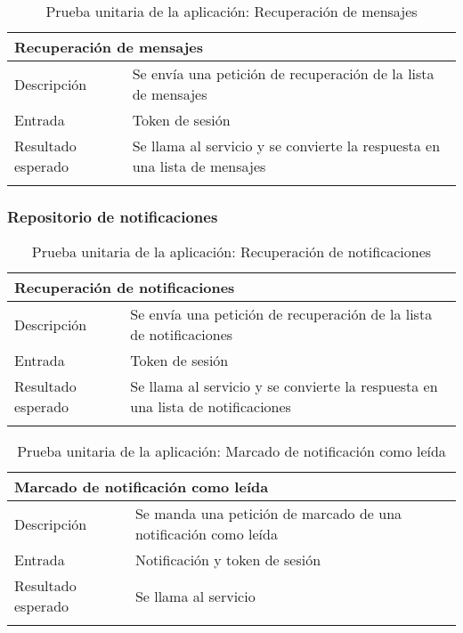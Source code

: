 \vspace{-15pt}
\begin{longtable}{|p{} p{}|}
    \hline
    \multicolumn{2}{|l|}{\textbf{Recuperación de mensajes}} \\ \hline 
    Descripción                 & Se envía una petición de recuperación de la lista de mensajes \\ \hline
    Entrada                     & Token de sesión \\ \hline
    Resultado esperado          & Se llama al servicio y se convierte la respuesta en una lista de mensajes \\ \hline
    \caption{Prueba unitaria de la aplicación: Recuperación de mensajes}
    \label{cp:u:app:recuperacion_mensajes_repo}
\end{longtable}
    
\vspace{-25pt}
\subsubsection{Repositorio de notificaciones}

\begin{longtable}{|p{} p{}|}
    \hline
    \multicolumn{2}{|l|}{\textbf{Recuperación de notificaciones}} \\ \hline 
    Descripción                 & Se envía una petición de recuperación de la lista de notificaciones \\ \hline
    Entrada                     & Token de sesión \\ \hline
    Resultado esperado          & Se llama al servicio y se convierte la respuesta en una lista de notificaciones \\ \hline
    \caption{Prueba unitaria de la aplicación: Recuperación de notificaciones}
    \label{cp:u:app:recuperacion_notificaciones_repo}
\end{longtable}

\vspace{-15pt}
\begin{longtable}{|p{} p{}|}
    \hline
    \multicolumn{2}{|l|}{\textbf{Marcado de notificación como leída}} \\ \hline 
    Descripción                 & Se manda una petición de marcado de una notificación como leída \\ \hline
    Entrada                     & Notificación y token de sesión \\ \hline
    Resultado esperado          & Se llama al servicio  \\ \hline
    \caption{Prueba unitaria de la aplicación: Marcado de notificación como leída}
    \label{cp:u:app:marcado_notificacion_leida_repo}
\end{longtable}

